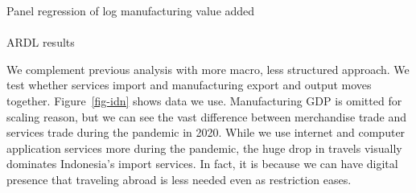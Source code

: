 \documentclass[
  letterpaper,
  DIV=11,
  numbers=noendperiod]{scrartcl}
\makeatletter
\let\oldparagraph\paragraph
\renewcommand{\paragraph}{
    \@ifstar
      \xxxParagraphStar
      \xxxParagraphNoStar
  }
\newcommand{\xxxParagraphStar}[1]{\oldparagraph*{#1}\mbox{}}
\newcommand{\xxxParagraphNoStar}[1]{\oldparagraph{#1}\mbox{}}
\makeatother
\begin{document}
\begin{table}

\caption{\label{tbl-regvv}Panel regression of log manufacturing value
added}


\end{table}%

\paragraph{ARDL results}\label{ardl-results}

We complement previous analysis with more macro, less structured
approach. We test whether services import and manufacturing export and
output moves together. Figure~\ref{fig-idn} shows data we use.
Manufacturing GDP is omitted for scaling reason, but we can see the vast
difference between merchandise trade and services trade during the
pandemic in 2020. While we use internet and computer application
services more during the pandemic, the huge drop in travels visually
dominates Indonesia's import services. In fact, it is because we can
have digital presence that traveling abroad is less needed even as
restriction eases.
\end{document}
